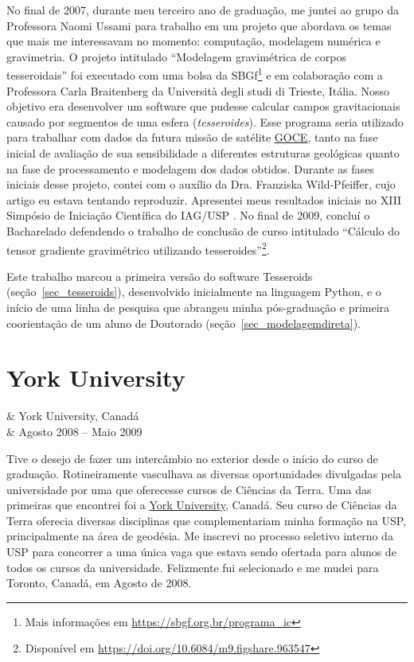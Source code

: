 \documentclass[10pt,a4paper,oneside]{book}
\begin{document}
No final de 2007, durante meu terceiro ano de graduação, me juntei ao grupo da
Professora Naomi Ussami para trabalho em um projeto que abordava os temas que
mais me interessavam no momento: computação, modelagem numérica e gravimetria.
O projeto intitulado ``Modelagem gravimétrica de corpos tesseroidais'' foi
executado com uma bolsa da
SBGf\footnote{Mais informações em \url{https://sbgf.org.br/programa_ic}}
e em colaboração com a Professora Carla Braitenberg da Università degli studi
di Trieste, Itália.
Nosso objetivo era desenvolver um software que pudesse calcular campos
gravitacionais causado por segmentos de uma esfera (\textit{tesseroides}).
Esse programa seria utilizado para trabalhar com dados da futura missão de
satélite \href{https://www.esa.int/Enabling_Support/Operations/GOCE}{GOCE},
tanto na fase inicial de avaliação de sua sensibilidade a diferentes estruturas
geológicas quanto na fase de processamento e modelagem dos dados obtidos.
Durante as fases iniciais desse projeto, contei com o auxílio da Dra.
Franziska Wild-Pfeiffer, cujo artigo \citep{WildPfeiffer2008} eu estava
tentando reproduzir.
Apresentei meus resultados iniciais no XIII Simpósio de Iniciação Científica do
IAG/USP \citep{Uieda2008}.
No final de 2009, concluí o Bacharelado defendendo o trabalho de conclusão de
curso intitulado ``Cálculo do tensor gradiente gravimétrico utilizando
tesseroides''\footnote{Disponível em \url{https://doi.org/10.6084/m9.figshare.963547}}.

Este trabalho marcou a primeira versão do software Tesseroids
(seção~\ref{sec_tesseroids}), desenvolvido inicialmente na linguagem Python,
e o início de uma linha de pesquisa que abrangeu minha pós-graduação e primeira
coorientação de um aluno de Doutorado (seção~\ref{sec_modelagemdireta}).

\section{York University}
\label{sec_york}

\begin{subsummarybox}[frametitle=\faPlane{}\quad Intercâmbio internacional]
  \begin{fa-ul}
    \faUniversity & York University, Canadá\\
    \faCalendar & Agosto 2008 -- Maio 2009
  \end{fa-ul}
\end{subsummarybox}

Tive o desejo de fazer um intercâmbio no exterior desde o início do curso de
graduação.
Rotineiramente vasculhava as diversas oportunidades divulgadas pela
universidade por uma que oferecesse cursos de Ciências da Terra.
Uma das primeiras que encontrei foi a \href{https://www.yorku.ca/}{York University},
Canadá.
Seu curso de Ciências da Terra oferecia diversas disciplinas que
complementariam minha formação na USP, principalmente na área de geodésia.
Me inscrevi no processo seletivo interno da USP para concorrer a uma única vaga
que estava sendo ofertada para alunos de todos os cursos da universidade.
Felizmente fui selecionado e me mudei para Toronto, Canadá, em Agosto de 2008.
\end{document}
